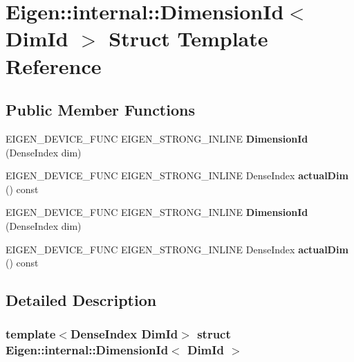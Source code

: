 \hypertarget{struct_eigen_1_1internal_1_1_dimension_id}{}\section{Eigen\+:\+:internal\+:\+:Dimension\+Id$<$ Dim\+Id $>$ Struct Template Reference}
\label{struct_eigen_1_1internal_1_1_dimension_id}
\subsection*{Public Member Functions}
\begin{DoxyCompactItemize}
\item 
\mbox{\label{struct_eigen_1_1internal_1_1_dimension_id_a3f1514c110d751017eb6f349534debf8}} 
E\+I\+G\+E\+N\+\_\+\+D\+E\+V\+I\+C\+E\+\_\+\+F\+U\+NC E\+I\+G\+E\+N\+\_\+\+S\+T\+R\+O\+N\+G\+\_\+\+I\+N\+L\+I\+NE {\bfseries Dimension\+Id} (Dense\+Index dim)
\item 
\mbox{\label{struct_eigen_1_1internal_1_1_dimension_id_a97aa5194b461b7071fc0aa5e00bff99f}} 
E\+I\+G\+E\+N\+\_\+\+D\+E\+V\+I\+C\+E\+\_\+\+F\+U\+NC E\+I\+G\+E\+N\+\_\+\+S\+T\+R\+O\+N\+G\+\_\+\+I\+N\+L\+I\+NE Dense\+Index {\bfseries actual\+Dim} () const
\item 
\mbox{\label{struct_eigen_1_1internal_1_1_dimension_id_a3f1514c110d751017eb6f349534debf8}} 
E\+I\+G\+E\+N\+\_\+\+D\+E\+V\+I\+C\+E\+\_\+\+F\+U\+NC E\+I\+G\+E\+N\+\_\+\+S\+T\+R\+O\+N\+G\+\_\+\+I\+N\+L\+I\+NE {\bfseries Dimension\+Id} (Dense\+Index dim)
\item 
\mbox{\label{struct_eigen_1_1internal_1_1_dimension_id_a97aa5194b461b7071fc0aa5e00bff99f}} 
E\+I\+G\+E\+N\+\_\+\+D\+E\+V\+I\+C\+E\+\_\+\+F\+U\+NC E\+I\+G\+E\+N\+\_\+\+S\+T\+R\+O\+N\+G\+\_\+\+I\+N\+L\+I\+NE Dense\+Index {\bfseries actual\+Dim} () const
\end{DoxyCompactItemize}


\subsection{Detailed Description}
\subsubsection*{template$<$Dense\+Index Dim\+Id$>$\newline
struct Eigen\+::internal\+::\+Dimension\+Id$<$ Dim\+Id $>$}



